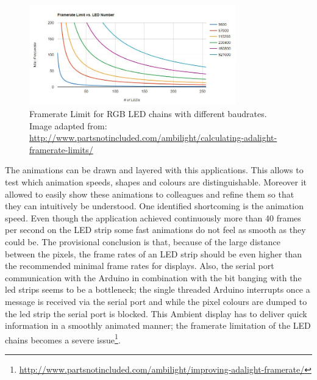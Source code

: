 \begin{figure}
    \includegraphics[width=0.8\textwidth]{fig/FPS.JPG}
    \caption[Framerate Limit of RGB LEDs]{Framerate Limit for RGB LED chains with different baudrates. Image adapted from: \url{http://www.partsnotincluded.com/ambilight/calculating-adalight-framerate-limits/}}
    \label{fig:FPS}
\end{figure}

The animations can be drawn and layered with this applications. This allows to test which animation speeds, shapes and colours are distinguishable. Moreover it allowed to easily show these animations to colleagues and refine them so that they can intuitively be understood. One identified shortcoming is the animation speed. Even though the application achieved continuously more than 40 frames per second on the LED strip some fast animations do not feel as smooth as they could be. The provisional conclusion is that, because of the large distance between the pixels, the frame rates of an LED strip should be even higher than the recommended minimal frame rates for displays. Also, the serial port communication with the Arduino in combination with the bit banging with the led strips seems to be a bottleneck; the single threaded Arduino interrupts once a message is received via the serial port and while the pixel colours are dumped to the led strip the serial port is blocked.  This Ambient display has to deliver quick information in a smoothly animated manner; the framerate limitation of the LED chains becomes a severe issue\footnote{\url{http://www.partsnotincluded.com/ambilight/improving-adalight-framerate/}}. 

